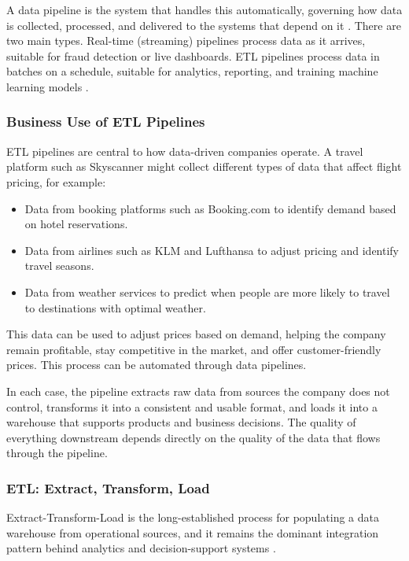 \documentclass[12pt]{article}
\begin{document}
A data pipeline is the system that handles this automatically, governing how data is collected, processed, and delivered to the systems that depend on it \cite{munappy2020datapipeline}. There are two main types. Real-time (streaming) pipelines process data as it arrives, suitable for fraud detection or live dashboards. ETL pipelines process data in batches on a schedule, suitable for analytics, reporting, and training machine learning models \cite{vassiliadis2009etl}.

\subsubsection{Business Use of ETL Pipelines}

ETL pipelines are central to how data-driven companies operate. A travel platform such as Skyscanner might collect different types of data that affect flight pricing, for example:

\begin{itemize}
  \item Data from booking platforms such as Booking.com to identify demand based on hotel reservations.
  \item Data from airlines such as KLM and Lufthansa to adjust pricing and identify travel seasons.
  \item Data from weather services to predict when people are more likely to travel to destinations with optimal weather.
\end{itemize}

This data can be used to adjust prices based on demand, helping the company remain profitable, stay competitive in the market, and offer customer-friendly prices. This process can be automated through data pipelines.

In each case, the pipeline extracts raw data from sources the company does not control, transforms it into a consistent and usable format, and loads it into a warehouse that supports products and business decisions. The quality of everything downstream depends directly on the quality of the data that flows through the pipeline.

\subsubsection{ETL: Extract, Transform, Load}

Extract-Transform-Load is the long-established process for populating a data warehouse from operational sources, and it remains the dominant integration pattern behind analytics and decision-support systems \cite{vassiliadis2009etl, chaudhuri1997olap}.
\end{document}
